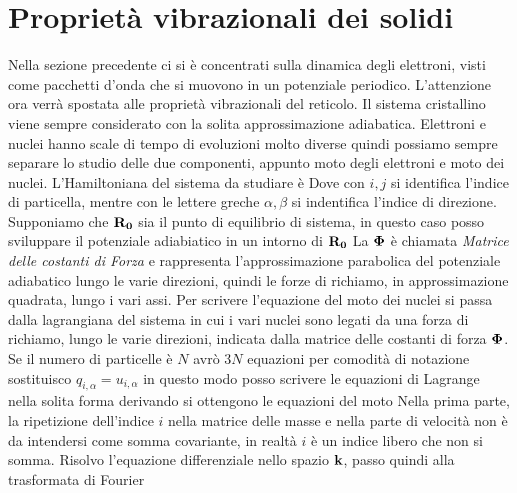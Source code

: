\documentclass[a4paper,12pt]{article}
\begin{document}
\section{ Proprietà vibrazionali dei solidi}
Nella sezione precedente ci si è concentrati sulla dinamica degli elettroni, visti come pacchetti d'onda che si muovono in un potenziale periodico. L'attenzione ora verrà spostata alle proprietà vibrazionali del reticolo. Il sistema cristallino viene sempre considerato con la solita approssimazione adiabatica. Elettroni e nuclei hanno scale di tempo di evoluzioni molto diverse quindi possiamo sempre separare lo studio delle due componenti, appunto moto degli elettroni e moto dei nuclei. L'Hamiltoniana del sistema da studiare è
Dove con $i, j$ si identifica l'indice di particella, mentre con le lettere greche $\alpha, \beta$ si indentifica l'indice di direzione.
Supponiamo che $\it\bf R_0$ sia il punto di equilibrio di sistema, in questo caso posso sviluppare il potenziale adiabiatico in un intorno di $\it\bf R_0$ 
La $\it\bf \Phi$ è chiamata \textit{Matrice delle costanti di Forza} e rappresenta l'approssimazione parabolica del potenziale adiabatico lungo le varie direzioni, quindi le forze di richiamo, in approssimazione quadrata, lungo i vari assi. Per scrivere l'equazione del moto dei nuclei si passa dalla lagrangiana del sistema in cui i vari nuclei sono legati da una forza di richiamo, lungo le varie direzioni, indicata dalla matrice delle costanti di forza $\it\bf \Phi$. Se il numero di particelle è $N$ avrò $3N$ equazioni 
per comodità di notazione sostituisco $q_{i,\alpha} = u_{i,\alpha}$ in questo modo posso scrivere le equazioni di Lagrange nella solita forma
derivando si ottengono le equazioni del moto
Nella prima parte, la ripetizione dell'indice $i$ nella matrice delle masse e nella parte di velocità non è da intendersi come somma covariante, in realtà $i$ è un indice libero che non si somma. Risolvo l'equazione differenziale nello spazio $\it\bf k$, passo quindi alla trasformata di Fourier 
\end{document}

